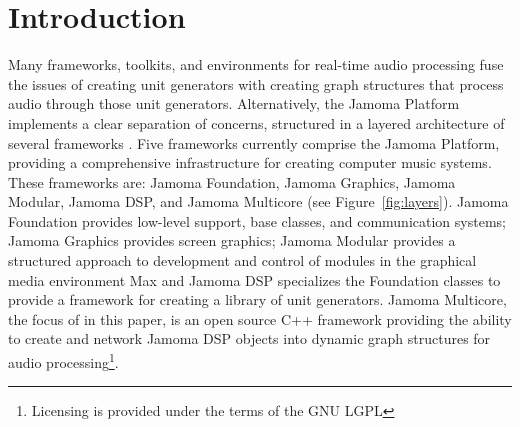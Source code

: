 \documentclass[twoside,a4paper]{article}
\title{\papertitle}
\begin{document}

\maketitle





\begin{abstract}

Jamoma Multicore is a framework for creating graph structures in which unit generators are connected together to process multichannel audio in real-time.  The main applications currently are processing of multichannel audio signals in Max/MSP and live audio coding in Ruby.  Jamoma Multicore forms part of the Jamoma layered architecture.

\end{abstract}




\section{Introduction} %
\label{sec:intro}

Many frameworks, toolkits, and environments for real-time audio processing fuse the issues of creating unit generators with creating graph structures that process audio through those unit generators.  Alternatively, the Jamoma Platform implements a clear separation of concerns, structured in a layered architecture of several frameworks \cite{Place:2010}. Five frameworks currently comprise the Jamoma Platform, providing a comprehensive infrastructure for creating computer music systems. These frameworks are: Jamoma Foundation, Jamoma Graphics, Jamoma Modular, Jamoma DSP, and Jamoma Multicore (see Figure~\ref{fig:layers}). Jamoma Foundation provides low-level support, base classes, and communication systems; Jamoma Graphics provides screen graphics; Jamoma Modular provides a structured approach to development and control of modules in the graphical media environment Max \cite{Place:2006} and Jamoma DSP specializes the Foundation classes to provide a framework for creating a library of unit generators. Jamoma Multicore, the focus of in this paper, is an open source C++ framework providing the ability to create and network Jamoma DSP objects into dynamic graph structures for audio processing\footnote{Licensing is provided under the terms of the GNU LGPL}.  
\end{document}
